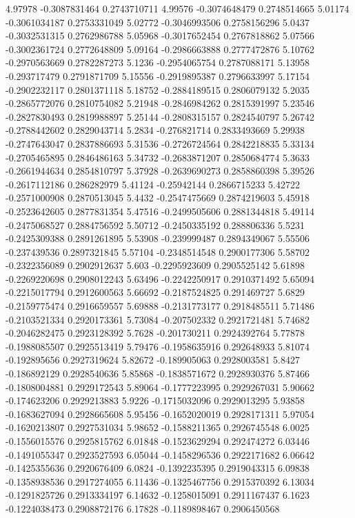 {4.97978 -0.3087831464 0.2743710711
4.99576 -0.3074648479 0.2748514665
5.01174 -0.3061034187 0.2753331049
5.02772 -0.3046993506 0.2758156296
5.0437 -0.3032531315 0.2762986788
5.05968 -0.3017652454 0.2767818862
5.07566 -0.3002361724 0.2772648809
5.09164 -0.2986663888 0.2777472876
5.10762 -0.2970563669 0.2782287273
5.1236 -0.2954065754 0.2787088171
5.13958 -0.293717479 0.2791871709
5.15556 -0.2919895387 0.2796633997
5.17154 -0.2902232117 0.2801371118
5.18752 -0.2884189515 0.2806079132
5.2035 -0.2865772076 0.2810754082
5.21948 -0.2846984262 0.2815391997
5.23546 -0.2827830493 0.2819988897
5.25144 -0.2808315157 0.2824540797
5.26742 -0.2788442602 0.2829043714
5.2834 -0.276821714 0.2833493669
5.29938 -0.2747643047 0.2837886693
5.31536 -0.2726724564 0.2842218835
5.33134 -0.2705465895 0.2846486163
5.34732 -0.2683871207 0.2850684774
5.3633 -0.2661944634 0.2854810797
5.37928 -0.2639690273 0.2858860398
5.39526 -0.2617112186 0.286282979
5.41124 -0.25942144 0.2866715233
5.42722 -0.2571000908 0.2870513045
5.4432 -0.2547475669 0.2874219603
5.45918 -0.2523642605 0.2877831354
5.47516 -0.2499505606 0.2881344818
5.49114 -0.2475068527 0.2884756592
5.50712 -0.2450335192 0.288806336
5.5231 -0.2425309388 0.2891261895
5.53908 -0.239999487 0.2894349067
5.55506 -0.237439536 0.2897321845
5.57104 -0.2348514548 0.2900177306
5.58702 -0.2322356089 0.2902912637
5.603 -0.2295923609 0.2905525142
5.61898 -0.2269220698 0.2908012243
5.63496 -0.2242250917 0.2910371492
5.65094 -0.2215017794 0.2912600563
5.66692 -0.2187524825 0.291469727
5.6829 -0.2159775474 0.2916659557
5.69888 -0.2131773177 0.2918485511
5.71486 -0.2103521334 0.2920173361
5.73084 -0.207502332 0.2921721481
5.74682 -0.2046282475 0.2923128392
5.7628 -0.201730211 0.2924392764
5.77878 -0.1988085507 0.2925513419
5.79476 -0.1958635916 0.292648933
5.81074 -0.192895656 0.2927319624
5.82672 -0.189905063 0.2928003581
5.8427 -0.186892129 0.2928540636
5.85868 -0.1838571672 0.2928930376
5.87466 -0.1808004881 0.2929172543
5.89064 -0.1777223995 0.2929267031
5.90662 -0.174623206 0.2929213883
5.9226 -0.1715032096 0.2929013295
5.93858 -0.1683627094 0.2928665608
5.95456 -0.1652020019 0.2928171311
5.97054 -0.1620213807 0.2927531034
5.98652 -0.1588211365 0.2926745548
6.0025 -0.1556015576 0.2925815762
6.01848 -0.1523629294 0.292474272
6.03446 -0.1491055347 0.2923527593
6.05044 -0.1458296536 0.2922171682
6.06642 -0.1425355636 0.2920676409
6.0824 -0.1392235395 0.2919043315
6.09838 -0.1358938536 0.2917274055
6.11436 -0.1325467756 0.2915370392
6.13034 -0.1291825726 0.2913334197
6.14632 -0.1258015091 0.2911167437
6.1623 -0.1224038473 0.2908872176
6.17828 -0.1189898467 0.2906450568
}
